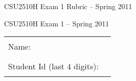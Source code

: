 \documentclass[12pt]{article}                   %
\begin{document}
\vspace*{-1.5cm}
\ifrubric
\centerline{\Large CSU2510H Exam 1 Rubric -- Spring 2011}

\else
\centerline{\Large CSU2510H Exam 1 -- Spring 2011}

\vspace{0.5cm}

\begin{center}
\begin{tabular}{l@{\qquad}l}
Name:                        & \rule{174pt}{1pt} \\[.5cm]
Student Id (last 4 digits):  & \rule{174pt}{1pt} \\[.5cm]
\end{tabular}
\end{center}
\end{document}
